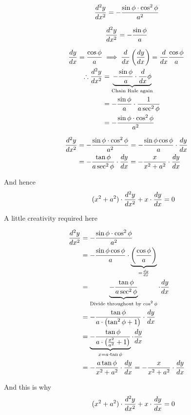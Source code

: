 \documentclass[14pt,fleqn]{extarticle}
\begin{document}
\newcard

\[ \frac{d^2 y}{dx^2} = -\frac{\sin\phi\cdot\cos^2\phi}{a^2} \] 

\newcard 

\[ \frac{d^2 y}{dx^2} = -\frac{\sin\phi}{a} \]

\newcard 

\begin{align}
	\frac{dy}{dx} = \frac{\cos\phi}{a} &\implies \frac{d}{dx} \left(\frac{dy}{dx} \right) = \frac{d}{dx} \frac{\cos\phi}{a} \\
	\therefore \frac{d^2 y}{dx^2} &= \underbrace{-\frac{\sin\phi}{a}\cdot \frac{d}{dx} \phi}_{\text{Chain Rule again}} \\
	&= -\frac{\sin\phi}{a}\cdot \frac{1}{a\sec^2\phi} \\
	&= -\frac{\sin\phi\cdot\cos^2\phi}{a^2}
\end{align}

\newcard 

\begin{align}
\frac{d^2 y}{dx^2} &= -\frac{\sin\phi\cdot\cos^2\phi}{a^2} = -\frac{\sin\phi\cos\phi}{a}\cdot \frac{dy}{dx} \\
&= -\frac{\tan\phi}{a\sec^2\phi} \cdot \frac{dy}{dx} = -\frac{x}{x^2+a^2}\cdot \frac{dy}{dx}
\end{align}

And hence 
\[ \qquad (x^2+a^2)\cdot\frac{d^2 y}{dx^2} + x\cdot\frac{dy}{dx} = 0 \]

\newcard 

A little creativity required here 

\begin{align}
\frac{d^2 y}{dx^2} &= -\frac{\sin\phi\cdot\cos^2\phi}{a^2} \\
&= -\frac{\sin\phi\cos\phi}{a}\cdot \underbrace{\left(\frac{\cos\phi}{a} \right)}_{ = \frac{dy}{dx} } \\
&= \underbrace{-\frac{\tan\phi}{a\sec^2\phi}}_{\text{Divide throughout by $\cos^2\phi$}} \cdot \frac{dy}{dx} \\ 
&= -\frac{\tan\phi}{a\cdot \left(\tan^2\phi + 1 \right)}\cdot\frac{dy}{dx} \\
&= \underbrace{-\frac{\tan\phi}{a\cdot \left(\frac{x^2}{a^2} + 1\right)}}_{x = a\cdot\tan\phi}\cdot\frac{dy}{dx} \\
&= -\frac{a\tan\phi}{x^2+a^2}\cdot \frac{dy}{dx} = -\frac{x}{x^2+a^2}\cdot \frac{dy}{dx}
\end{align}

And this is why 
\[ \qquad (x^2+a^2)\cdot\frac{d^2 y}{dx^2} + x\cdot\frac{dy}{dx} = 0 \]
\end{document}
